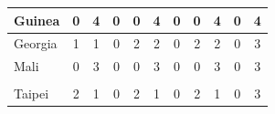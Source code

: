 \documentclass[12pt]{article}  %
\begin{document}
\begin{subappendices}
\begin{longtable}{|l|c|c|c|c|c|c|c|c|c|c|}
	\hline
	Guinea                                                         & 0                                                                      & 4                                                                      & 0                                                                      & 0                                                                      & 4                                                                      & 0                                                                      & 0                         & 4                           & 0                           & 4                           \\ 
	\hline
	Georgia                                                        & 1                                                                      & 1                                                                      & 0                                                                      & 2                                                                      & 2                                                                      & 0                                                                      & 2                         & 2                           & 0                           & 3                           \\ 
	\hline
	Mali                                                           & 0                                                                      & 3                                                                      & 0                                                                      & 0                                                                      & 3                                                                      & 0                                                                      & 0                         & 3                           & 0                           & 3                           \\ 
	\hline
	\begin{tabular}[c]{@{}l@{}}Chinese\\Taipei\end{tabular}        & 2                                                                      & 1                                                                      & 0                                                                      & 2                                                                      & 1                                                                      & 0                                                                      & 2                         & 1                           & 0                           & 3                           \\ 

\end{longtable}
\end{subappendices}
\end{document}
